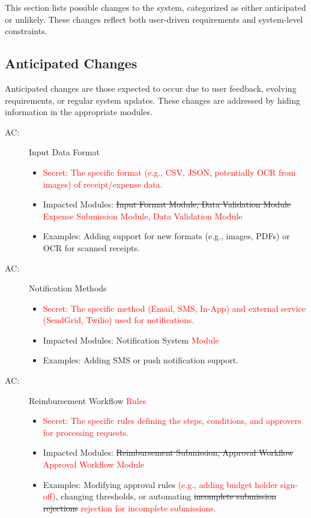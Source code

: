 \documentclass[12pt, titlepage]{article}
\newcounter{acnum}
\newcommand{\actheacnum}{AC\theacnum}
\begin{document}
This section lists possible changes to the system, categorized as either anticipated or unlikely. These changes reflect both user-driven requirements and system-level constraints.

\subsection{Anticipated Changes} \label{SecAchange}

Anticipated changes are those expected to occur due to user feedback, evolving requirements, or regular system updates. These changes are addressed by hiding information in the appropriate modules.

\begin{description}
\item[ \actheacnum \label{acInput}:] Input Data Format
\begin{itemize}
    \item \textcolor{red}{Secret:} \textcolor{red}{The specific format (e.g., CSV, JSON, potentially OCR from images) of receipt/expense data.}
    \item Impacted Modules: \sout{Input Format Module, Data Validation Module} \textcolor{red}{Expense Submission Module, Data Validation Module}
    \item Examples: Adding support for new formats (e.g., images, PDFs) or OCR for scanned receipts.
\end{itemize}

\item[ \actheacnum \label{acNotifications}:] Notification Methods
\begin{itemize}
    \item \textcolor{red}{Secret:} \textcolor{red}{The specific method (Email, SMS, In-App) and external service (SendGrid, Twilio) used for notifications.}
    \item Impacted Modules: Notification System \textcolor{red}{Module}
    \item Examples: Adding SMS or push notification support.
\end{itemize}

\item[ \actheacnum \label{acWorkflow}:] Reimbursement Workflow \textcolor{red}{Rules}
\begin{itemize}
    \item \textcolor{red}{Secret:} \textcolor{red}{The specific rules defining the steps, conditions, and approvers for processing requests.}
    \item Impacted Modules: \sout{Reimbursement Submission, Approval Workflow} \textcolor{red}{Approval Workflow Module}
    \item Examples: Modifying approval rules \textcolor{red}{(e.g., adding budget holder sign-off)}, changing thresholds, or automating \sout{incomplete submission rejections} \textcolor{red}{rejection for incomplete submissions}.
\end{itemize}


\end{description}
\end{document}
